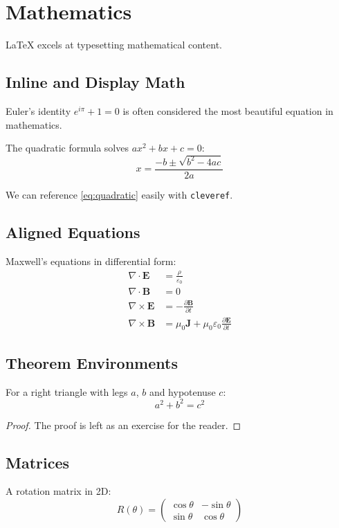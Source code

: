 \section{Mathematics}
\label{sec:mathematics}

\LaTeX{} excels at typesetting mathematical content.

\subsection{Inline and Display Math}

Euler's identity $e^{i\pi} + 1 = 0$ is often considered the most beautiful
equation in mathematics.

The quadratic formula solves $ax^2 + bx + c = 0$:
\begin{equation}
    x = \frac{-b \pm \sqrt{b^2 - 4ac}}{2a}
    \label{eq:quadratic}
\end{equation}

We can reference \cref{eq:quadratic} easily with \texttt{cleveref}.

\subsection{Aligned Equations}

Maxwell's equations in differential form:
\begin{align}
    \nabla \cdot \mathbf{E}  &= \frac{\rho}{\varepsilon_0}
        \label{eq:gauss} \\
    \nabla \cdot \mathbf{B}  &= 0
        \label{eq:gauss-mag} \\
    \nabla \times \mathbf{E} &= -\frac{\partial \mathbf{B}}{\partial t}
        \label{eq:faraday} \\
    \nabla \times \mathbf{B} &= \mu_0 \mathbf{J}
        + \mu_0 \varepsilon_0 \frac{\partial \mathbf{E}}{\partial t}
        \label{eq:ampere}
\end{align}

\subsection{Theorem Environments}

\begin{theorem}
    \label{thm:pythagoras}
    For a right triangle with legs $a$, $b$ and hypotenuse $c$:
    \[ a^2 + b^2 = c^2 \]
\end{theorem}

\begin{proof}
    The proof is left as an exercise for the reader.
\end{proof}

\subsection{Matrices}

A rotation matrix in 2D:
\begin{equation}
    R(\theta) = \begin{pmatrix}
        \cos\theta & -\sin\theta \\
        \sin\theta &  \cos\theta
    \end{pmatrix}
\end{equation}
